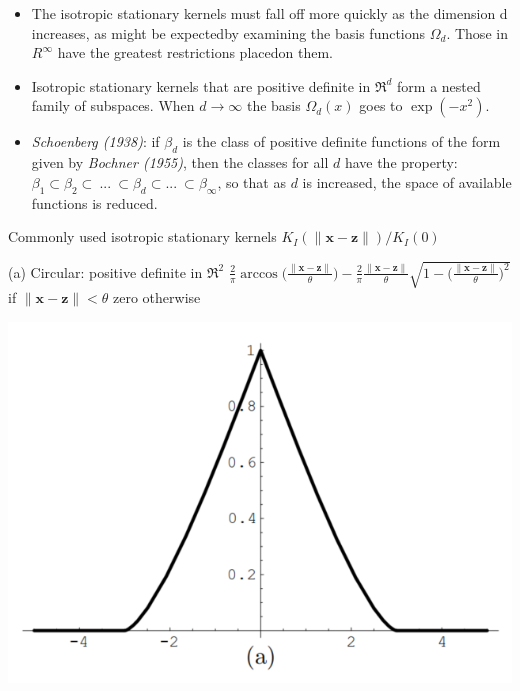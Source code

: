 \documentclass[
  ignorenonframetext,
]{beamer}
\begin{document}
\begin{frame}{}
\protect\hypertarget{section-3}{}
\begin{itemize}
\item
  The isotropic stationary kernels must fall off more quickly as the
  dimension d increases, as might be expectedby examining the basis
  functions \(\Omega_d\). Those in \(R^\infty\) have the greatest
  restrictions placedon them.
\item
  Isotropic stationary kernels that are positive definite in
  \(\mathfrak R^d\) form a nested family of subspaces. When
  \(d \rightarrow \infty\) the basis \(\Omega_d(x)\) goes to
  \(\exp(-x^2)\).
\item
  \emph{Schoenberg (1938)}: if \(\beta_d\) is the class of positive
  definite functions of the form given by \emph{Bochner (1955)}, then
  the classes for all \(d\) have the property:
  \(\beta_1 \subset \beta_2 \subset \ ...\ \subset \beta_d \subset ...\ \subset \beta_\infty\),
  so that as \(d\) is increased, the space of available functions is
  reduced.
\end{itemize}
\end{frame}

\begin{frame}{Commonly used isotropic stationary kernels
\(K_I(\|\pmb x - \pmb z\|)/K_I(0)\)}
\protect\hypertarget{commonly-used-isotropic-stationary-kernels-k_ipmb-x---pmb-zk_i0}{}
\begin{block}{(a) Circular:}
\protect\hypertarget{a-circular}{}
positive definite in \(\mathfrak R^2\)
\({\frac 2 \pi} \arccos \Big(\frac {\|\pmb x - \pmb z\|} \theta \Big) - {\frac 2 \pi} \frac {\|\pmb x - \pmb z\|} \theta \sqrt {1 - \Big(\frac {\|\pmb x - \pmb z\|} \theta \Big)^2}\)
if \(\|\pmb x - \pmb z\| < \theta\) zero otherwise

\begin{center}\includegraphics[width=0.5\linewidth]{figure/marc_f2a} \end{center}
\end{block}
\end{frame}
\end{document}
